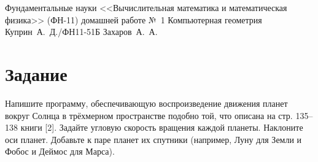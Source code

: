 \documentclass{bmstu}
\begin{document}
	\makereporttitle
	{Фундаментальные науки} %
	{<<Вычислительная математика и математическая физика>> (ФН-11)} %
	{домашней работе №~1} %
	{Компьютерная геометрия} %
	{} %
	{} %
	{Куприн~А.~Д./ФН11-51Б} %
	{Захаров~А.~А.} %
	
	\maketableofcontents
	
	\chapter{Задание}
	Напишите программу, обеспечивающую воспроизведение движения планет вокруг Солнца в трёхмерном пространстве подобно
	той, что описана на стр. 135–138 книги [2]. Задайте угловую скорость вращения каждой планеты. Наклоните оси планет. Добавьте
	к паре планет их спутники (например, Луну для Земли и Фобос и
	Деймос для Марса).
	
\end{document}
